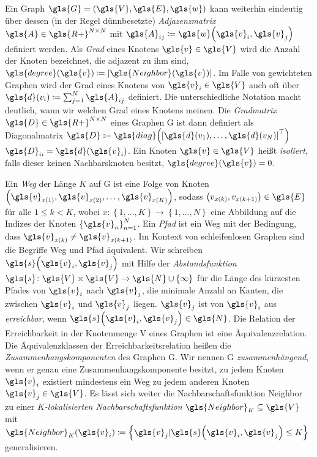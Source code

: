 Ein Graph $\gls{G} = \left(\gls{V}, \gls{E}, \gls{w}\right)$ kann weiterhin eindeutig über dessen (in der Regel dünnbesetzte) \emph{Adjazenzmatrix} $\gls{A} \in \gls{R+}^{N \times N}$ mit $\gls{A}_{ij} \coloneqq \gls{w}\left(\gls{v}_i, \gls{v}_j\right)$ definiert werden.
Als \emph{Grad} eines Knotens $\gls{v} \in \gls{V}$ wird die Anzahl der Knoten bezeichnet, die adjazent zu ihm sind, \dhe{} $\gls{degree}\left(\gls{v}\right) \coloneqq \left|\gls{Neighbor}\left(\gls{v}\right)\right|$.
Im Falle von gewichteten Graphen wird der Grad eines Knotens von $\gls{v}_i \in \gls{V}$ auch oft über $\gls{d}\left(v_i\right) \coloneqq \sum^N_{j=1} \gls{A}_{ij}$ definiert.
Die unterschiedliche Notation macht deutlich, wann wir welchen Grad eines Knotens meinen.
Die \emph{Gradmatrix} $\gls{D} \in \gls{R+}^{N \times N}$ eines Graphen \gls{G} ist dann definiert als Diagonalmatrix $\gls{D} \coloneqq \gls{diag}\left( {\left[ \gls{d}\left(v_1\right), \ldots, \gls{d}\left(v_N\right) \right]}^{\top} \right)$ \bzw{} $\gls{D}_{ii} = \gls{d}\left(\gls{v}_i\right)$.
Ein Knoten $\gls{v} \in \gls{V}$ heißt \emph{isoliert}, falls dieser keinen Nachbarsknoten besitzt, \dhe{} $\gls{degree}\left(\gls{v}\right) = 0$.

Ein \emph{Weg} der Länge $K$ auf \gls{G} ist eine Folge von Knoten $\left(\gls{v}_{x\left(1\right)}, \gls{v}_{x\left(2\right)}, \ldots, \gls{v}_{x\left(K\right)}\right)$, sodass $\left(v_{x\left(k\right)}, v_{x\left(k+1\right)}\right) \in \gls{E}$ für alle $1 \leq k < K$, wobei $x \colon \left\{ 1, \ldots, K \right\} \to \left\{ 1, \ldots, N \right\}$ eine Abbildung auf die Indizes der Knoten ${\left\{ \gls{v}_n \right\}}^N_{n=1}$.
Ein \emph{Pfad} ist ein Weg mit der Bedingung, dass $\gls{v}_{x\left(k\right)} \neq \gls{v}_{x\left(k+1\right)}$.
Im Kontext von schleifenlosen Graphen sind die Begriffe Weg und Pfad äquivalent.
Wir schreiben $\gls{s}\left(\gls{v}_i, \gls{v}_j\right)$ mit Hilfe der \emph{Abstandsfunktion} $\gls{s} \colon \gls{V} \times \gls{V} \to \gls{N} \cup \left\{\infty\right\}$ für die Länge des kürzesten Pfades von $\gls{v}_i$ nach $\gls{v}_j$, \dhe{} die minimale Anzahl an Kanten, die zwischen $\gls{v}_i$ und $\gls{v}_j$ liegen.
$\gls{v}_j$ ist von $\gls{v}_i$ aus \emph{erreichbar}, wenn $\gls{s}\left(\gls{v}_i, \gls{v}_j\right) \in \gls{N}$.
Die Relation der Erreichbarkeit in der Knotenmenge \gls{V} eines Graphen ist eine Äquivalenzrelation.
Die Äquivalenzklassen der Erreichbarkeitsrelation heißen die \emph{Zusammenhangskomponenten} des Graphen \gls{G}.
Wir nennen \gls{G} \emph{zusammenhängend}, wenn er genau eine Zusammenhangskomponente besitzt, \dhe{} zu jedem Knoten $\gls{v}_i$ existiert mindestens ein Weg zu jedem anderen Knoten $\gls{v}_j \in \gls{V}$.
Es lässt sich weiter die Nachbarschaftsfunktion \gls{Neighbor} zu einer \emph{$K$-lokalisierten Nachbarschaftsfunktion} $\gls{Neighbor}_K \subseteq \gls{V}$ mit $\gls{Neighbor}_K\left(\gls{v}_i\right) \coloneqq \left\{ \gls{v}_j | \gls{s}\left(\gls{v}_i, \gls{v}_j\right) \leq K \right\}$ generalisieren.

